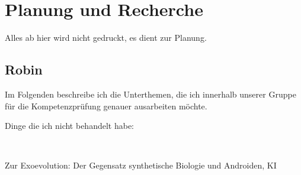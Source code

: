 \chapter*{Planung und Recherche}
\label{sec:planning-enquiry}
Alles ab hier wird nicht gedruckt, es dient zur Planung.

\section*{Robin}
Im Folgenden beschreibe ich die Unterthemen, die ich innerhalb unserer Gruppe für die
Kompetenzprüfung genauer ausarbeiten möchte.

\begin{description}
	\item[Dinge die ich nicht behandelt habe:]~ \vspace{-0.2cm}
\begin{multicols}{2}
\end{multicols}
\end{description}

Zur Exoevolution: Der Gegensatz synthetische Biologie und Androiden, KI

